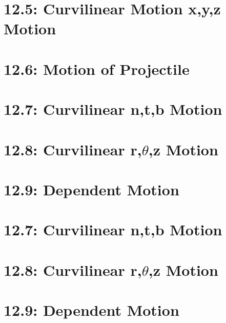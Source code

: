 \documentclass{wilson-summary}
\begin{document}
\section*{12.5: \quad Curvilinear Motion x,y,z Motion}



\newpage
\section*{12.6: Motion of Projectile} 



\newpage
\section*{12.7: Curvilinear n,t,b Motion}
\newpage

\section*{12.8: Curvilinear r,$\theta$,z Motion}
\newpage

\section*{12.9: Dependent Motion}
\newpage



\newpage
\section*{12.7: Curvilinear n,t,b Motion}
\section*{12.8: Curvilinear r,$\theta$,z Motion}
\section*{12.9: Dependent Motion}
\end{document}
